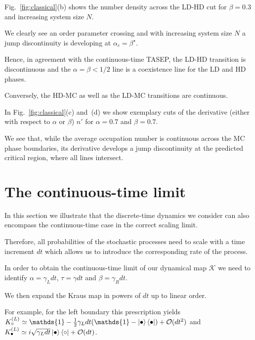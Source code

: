 \documentclass[aps,prl,twocolumn,groupedaddress,superscriptaddress,colorlinks,bookmarks=false,citecolor=darkspringgreen,linkcolor=darkolivegreen,urlcolor=navyblue]{revtex4-1}
\begin{document}
Fig.~\ref{fig:classical}(b) shows the number density across the LD-HD cut for $\beta= 0.3$ and increasing system size $N$.

We clearly see an order parameter crossing and with increasing system size $N$ a jump discontinuity is developing at $\alpha_c = \beta^\star$.

Hence, in agreement with the continuous-time TASEP, the LD-HD transition is discontinuous and the $\alpha = \beta <1/2$ line is a coexistence line for the LD and HD phases.

Conversely, the HD-MC as well as the LD-MC transitions are continuous.

In Fig.~\ref{fig:classical}(c) and~(d) we show exemplary cuts of the derivative (either with respect to $\alpha$ or $\beta$) $n'$ for $\alpha = 0.7$ and $\beta = 0.7$.

We see that, while the average occupation number is continuous across the MC phase boundaries, its derivative develops a jump discontinuity at the predicted critical region, where all lines intersect.












\section{The continuous-time limit}

In this section we illustrate that the discrete-time dynamics we consider can also encompass the continuous-time case in the correct scaling limit.

Therefore, all probabilities of the stochastic processes need to scale with a time increment $dt$ which allows us to introduce the corresponding rate of the process.

In order to obtain the continuous-time limit of our dynamical map $\mathcal{K}$ we need to identify $\alpha = \gamma_L dt$, $\tau = \gamma dt$ and $\beta = \gamma_R dt$.

We then expand the Kraus map in powers of $dt$ up to linear order.

For example, for the left boundary this prescription yields
$
K_{\circ}^{(L)} \simeq \mathds{1}  - \frac{1}{2}\gamma_L dt (\mathds{1}-\ket{\bullet}\bra{\bullet}) +  {\cal O} (dt^2)$ and $
K_{\bullet}^{(L)} \simeq i\sqrt{\gamma_L dt}\ket{\bullet}\bra{\circ} + {\cal O} (dt)$.
\end{document}
